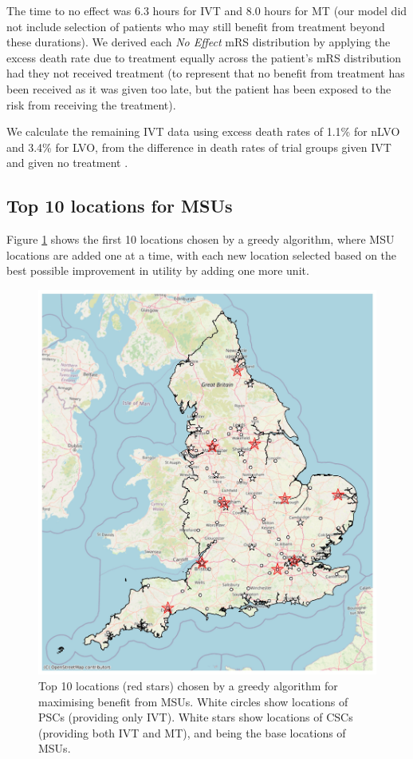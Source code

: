 The time to no effect was 6.3 hours for IVT \cite{emberson_effect_2014} and 8.0 hours for MT \cite{ fransen_time_2016} (our model did not include selection of patients who may still benefit from treatment beyond these durations). We derived each \textit{No Effect} mRS distribution by applying the excess death rate due to treatment equally across the patient’s mRS distribution had they not received treatment (to represent that no benefit from treatment has been received as it was given too late, but the patient has been exposed to the risk from receiving the treatment).

We calculate the remaining IVT data using excess death rates of 1.1\% for nLVO and 3.4\% for LVO, from the difference in death rates of trial groups given IVT and given no treatment \cite{emberson_effect_2014}.

\subsection{Top 10 locations for MSUs}

Figure \ref{fig:top_10} shows the first 10 locations chosen by a greedy algorithm, where MSU locations are added one at a time, with each new location selected based on the best possible improvement in utility by adding one more unit.

\begin{figure}
    \centering
    \includegraphics[width=1.0\linewidth]{images/top_10_msu_map.jpg}
    \caption{Top 10 locations (red stars) chosen by a greedy algorithm for maximising benefit from MSUs. White circles show locations of PSCs (providing only IVT). White stars show locations of CSCs (providing both IVT and MT), and being the base locations of MSUs.}
    \label{fig:top_10}
\end{figure}